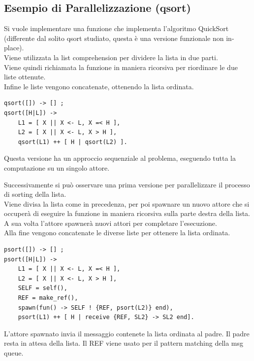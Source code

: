 \documentclass{article}
\begin{document}
\pagebreak

\subsection*{Esempio di Parallelizzazione (qsort)}
Si vuole implementare una funzione che implementa l'algoritmo QuickSort (differente dal solito qsort studiato, questa è una versione funzionale non in-place).\\
Viene utilizzata la list comprehension per dividere la lista in due parti.\\
Viene quindi richiamata la funzione in maniera ricorsiva per riordinare le due liste ottenute.\\
Infine le liste vengono concatenate, ottenendo la lista ordinata.
\begin{tcolorbox}
\begin{verbatim}
qsort([]) -> [] ;
qsort([H|L]) -> 
    L1 = [ X || X <- L, X =< H ],
    L2 = [ X || X <- L, X > H ],
    qsort(L1) ++ [ H | qsort(L2) ].
\end{verbatim}
\end{tcolorbox}

Questa versione ha un approccio sequenziale al problema, eseguendo tutta la computazione su un singolo attore.

Successivamente si può osservare una prima versione per parallelizzare il processo di sorting della lista.\\
Viene divisa la lista come in precedenza, per poi spawnare un nuovo attore che si occuperà di eseguire la funzione in maniera ricorsiva sulla parte destra della lista.\\
A sua volta l'attore spawnerà nuovi attori per completare l'esecuzione.\\
Alla fine vengono concatenate le diverse liste per ottenere la lista ordinata.
\begin{tcolorbox}
\begin{verbatim}
psort([]) -> [] ;
psort([H|L]) ->
    L1 = [ X || X <- L, X =< H ],
    L2 = [ X || X <- L, X > H ],
    SELF = self(),
    REF = make_ref(),
    spawn(fun() -> SELF ! {REF, psort(L2)} end),
    psort(L1) ++ [ H | receive {REF, SL2} -> SL2 end].
\end{verbatim}
\end{tcolorbox}

L'attore spawnato invia il messaggio contenete la lista ordinata al padre. Il padre resta in attesa della lista. Il REF viene usato per il pattern matching della msg queue.
\end{document}
